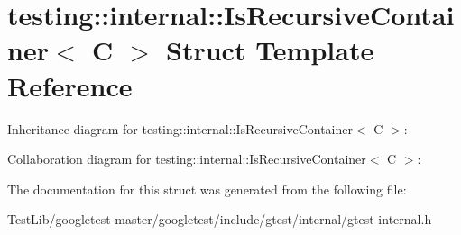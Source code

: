 \hypertarget{structtesting_1_1internal_1_1IsRecursiveContainer}{}\section{testing\+:\+:internal\+:\+:Is\+Recursive\+Container$<$ C $>$ Struct Template Reference}
\label{structtesting_1_1internal_1_1IsRecursiveContainer}


Inheritance diagram for testing\+:\+:internal\+:\+:Is\+Recursive\+Container$<$ C $>$\+:


Collaboration diagram for testing\+:\+:internal\+:\+:Is\+Recursive\+Container$<$ C $>$\+:


The documentation for this struct was generated from the following file\+:\begin{DoxyCompactItemize}
\item 
Test\+Lib/googletest-\/master/googletest/include/gtest/internal/gtest-\/internal.\+h\end{DoxyCompactItemize}
